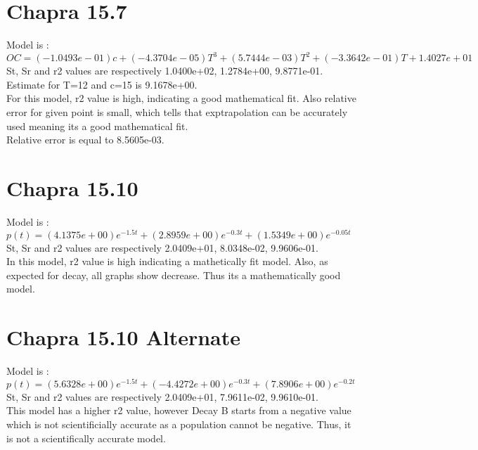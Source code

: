 \documentclass{article}
\begin{document}
\section{Chapra 15.7}

Model is : $ OC=(-1.0493e-01)c + (-4.3704e-05)T^3 + (5.7444e-03)T^2 + (-3.3642e-01)T + 1.4027e+01$ \\
St, Sr and r2 values are respectively 1.0400e+02, 1.2784e+00, 9.8771e-01. \\
Estimate for T=12 and c=15 is 9.1678e+00.\\
For this model, r2 value is high, indicating a good mathematical fit. Also relative error for given point is small, which tells that exptrapolation can be accurately used meaning its a good mathematical fit.\\
Relative error is equal to 8.5605e-03.\\

\section{Chapra 15.10}
Model is : $p(t)= (4.1375e+00)e^{-1.5t} +  (2.8959e+00)e^{-0.3t} + (1.5349e+00)e^{-0.05t}$\\
St, Sr and r2 values are respectively 2.0409e+01, 8.0348e-02, 9.9606e-01.\\
In this model, r2 value is high indicating a mathetically fit model. Also, as expected for decay, all graphs show decrease. Thus its a mathematically good model. \\ 
\section{Chapra 15.10 Alternate}
Model is : $p(t)= (5.6328e+00)e^{-1.5t} +  (-4.4272e+00)e^{-0.3t} + (7.8906e+00)e^{-0.2t}$ \\  
St, Sr and r2 values are respectively 2.0409e+01, 7.9611e-02, 9.9610e-01. \\
This model has a higher r2 value, however Decay B starts from a negative value which is not scientificially accurate as a population cannot be negative. Thus, it is not a scientifically accurate model.\\
\end{document}
